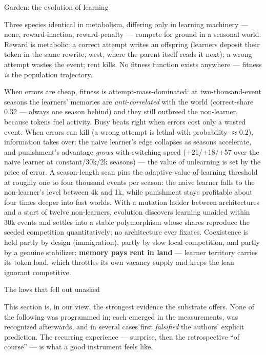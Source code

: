 \secc Garden: the evolution of learning

Three species identical in metabolism, differing only in learning
machinery --- none, reward-inaction, reward-penalty --- compete for
ground in a seasonal world. Reward is metabolic: a correct attempt
writes an offspring (learners deposit their token in the same
rewrite, west, where the parent itself reads it next); a wrong
attempt wastes the event; rent kills. No fitness function exists
anywhere --- fitness {\it is} the population trajectory.

When errors are cheap, fitness is attempt-mass-dominated: at
two-thousand-event seasons the learners' memories are {\it
anti-correlated} with the world (correct-share 0.32 --- always one
season behind) and they still outbreed the non-learner, because
tokens fuel activity. Busy beats right when errors cost only a
wasted event. When errors can kill (a wrong attempt is lethal with
probability ${\approx}0.2$), information takes over: the naive
learner's edge collapses as seasons accelerate, and punishment's
advantage {\it grows} with switching speed (+21/+18/+57 over the
naive learner at constant/30k/2k seasons) --- the value of
unlearning is set by the price of error. A season-length scan pins
the adaptive-value-of-learning threshold at roughly one to four
thousand events per season: the naive learner falls to the
non-learner's level between 4k and 1k, while punishment stays
profitable about four times deeper into fast worlds. With a mutation ladder
between architectures and a start of twelve non-learners, evolution
discovers learning unaided within 30k events and settles into a
stable polymorphism whose shares reproduce the seeded competition
quantitatively; no architecture ever fixates. Coexistence is held
partly by design (immigration), partly by slow local competition,
and partly by a genuine stabilizer: {\bf memory pays rent in land}
--- learner territory carries its token load, which throttles its
own vacancy supply and keeps the lean ignorant competitive.
\hfil\break{}

\sec The laws that fell out unasked

This section is, in our view, the strongest evidence the substrate
offers. None of the following was programmed in; each emerged in the
measurements, was recognized afterwards, and in several cases first
{\it falsified} the authors' explicit prediction. The recurring
experience --- surprise, then the retrospective ``of course'' --- is
what a good instrument feels like.

